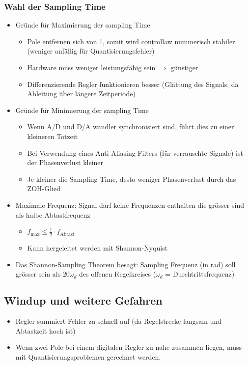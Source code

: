 \subsubsection{Wahl der Sampling Time}
\begin{itemize}
	\item Gründe für Maximierung der sampling Time
	\begin{itemize}
		\item Pole entfernen sich von 1, somit wird controllaw nummerisch stabiler. (weniger anfällig für Quantisierungsfehler)
		\item Hardware muss weniger leistungsfähig sein $\Rightarrow$ günstiger
		\item Differenzierende Regler funktionieren besser (Glättung des Signals, da Ableitung über längere Zeitperiode)
	\end{itemize}
	\item Gründe für Minimierung der sampling Time
	\begin{itemize}
		\item Wenn A/D und D/A wandler synchronisiert sind, führt dies zu einer kleineren Totzeit
		\item Bei Verwendung eines Anti-Aliasing-Filters (für verrauschte Signale) ist der Phasenverlust kleiner
		\item Je kleiner die Sampling Time, desto weniger Phasenverlust durch das ZOH-Glied
	\end{itemize}
	\item Maximale Frequenz: Signal darf keine Frequenzen enthalten die grösser sind als halbe Abtastfrequenz
	\begin{itemize}
		\item [] $f_\text{max}\leq \frac{1}{2}\cdot f_\text{Abtast}$
		\item Kann hergeleitet werden mit Shannon-Nyquist
	\end{itemize}
	\item Das Shannon-Sampling Theorem besagt: Sampling Frequenz (in rad) soll grösser sein als $20\omega_d$ des offenen Regelkreises ($\omega_d$ = Durchtrittsfrequenz)
\end{itemize}

\subsection{Windup und weitere Gefahren}
\begin{itemize}
	\item Regler summiert Fehler zu schnell auf (da Regelstrecke langsam und Abtastzeit hoch ist)
	\item Wenn zwei Pole bei einem digitalen Regler zu nahe zusammen liegen, muss mit Quantisierungsproblemen gerechnet werden. 
\end{itemize}
\newpage